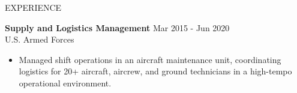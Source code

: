 \begin{rSection}{EXPERIENCE}
\begin{itemize}
 \end{itemize}
\textbf{Supply and Logistics Management} \hfill Mar 2015 - Jun 2020\\
U.S. Armed Forces
 \begin{itemize}
    \itemsep 3pt {}
    \item Managed shift operations in an aircraft maintenance unit, coordinating logistics for 20+ aircraft, aircrew, and ground technicians in a high-tempo operational environment.
 \end{itemize}
\end{rSection}

